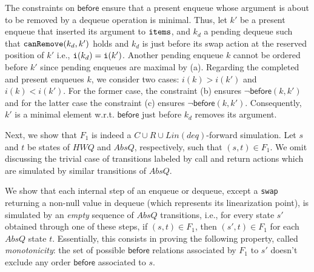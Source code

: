 %
%
The constraints on $\mathsf{before}$ ensure that a present enqueue whose argument is about to be removed by a dequeue operation is minimal. Thus, let $k'$ be a present enqueue that inserted its argument to ${\tt items}$, and $k_d$ a pending dequeue such that ${\tt canRemove}(k_d, k')$ holds and $k_d$ is just before its swap action at the reserved position of $k'$ i.e., ${\tt i}(k_d) = {\tt i}(k')$. Another pending enqueue $k$ cannot be ordered before $k'$ since pending enqueues are maximal by (a). Regarding the completed and present enqueues $k$, we consider two cases: $i(k) > i(k')$ and $i(k) < i(k')$. For the former case, the constraint (b) ensures $\neg \mathsf{before}(k,k')$ and for the latter case the constraint (c) ensures $\neg \mathsf{before}(k,k')$. Consequently, $k'$ is a minimal element w.r.t. $\mathsf{before}$ just before $k_d$ removes its argument.

Next, we show that $F_1$ is indeed a $C\cup R\cup Lin(deq)$-forward simulation. Let $s$ and $t$ be states of $\mathit{HWQ}$ and $AbsQ$, respectively, such that $(s,t)\in F_1$.
We omit discussing the trivial case of transitions labeled by call and return actions which are simulated by similar transitions of $AbsQ$. %

We show that each internal step of an enqueue or dequeue, except a {\tt swap} returning a non-null value in dequeue (which represents its linearization point), is simulated by an \emph{empty} sequence of $AbsQ$ transitions, i.e., for every state $s'$ obtained through one of these steps, if $(s,t)\in F_1$, then $(s',t)\in F_1$ for each $AbsQ$ state $t$.
Essentially, this consists in proving the following property, called \emph{monotonicity}: the set of possible $\mathsf{before}$ relations associated by $F_1$ to $s'$ doesn't exclude any order $\mathsf{before}$ associated to $s$.

